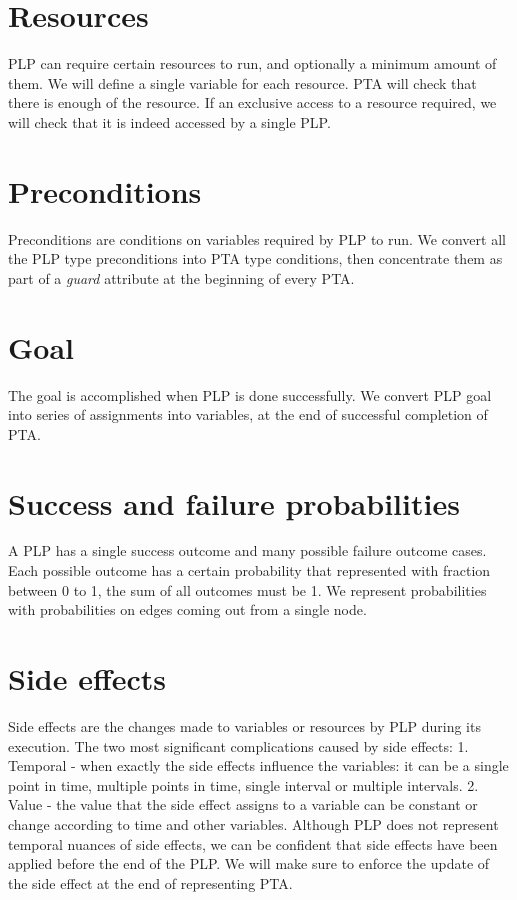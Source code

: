 \section{Resources \label{plp_to_pta_resources}}
PLP can require certain resources to run, and optionally a minimum amount of them. We will define a single variable for each resource. PTA will check that there is enough of the resource. If an exclusive access to a resource required, we will check that it is indeed accessed by a single PLP.\\
\section{Preconditions \label{plp_to_pta_preconditions}}
Preconditions are conditions on variables required by PLP to run. We convert all the PLP type preconditions into PTA type conditions, then concentrate them as part of a \textit{guard} attribute at the beginning of every PTA.\\
\section{Goal \label{plp_to_pta_goal}}
The goal is accomplished when PLP is done successfully. We convert PLP goal into series of assignments into variables, at the end of successful completion of PTA.\\
\section{Success and failure probabilities \label{plp_to_pta_success_and_failure_probabilities}}
A PLP has a single success outcome and many possible failure outcome cases. Each possible outcome has a certain probability that represented with fraction between 0 to 1, the sum of all outcomes must be 1. We represent probabilities with probabilities on edges coming out from a single node. \\
\section{Side effects \label{plp_to_pta_side_effects}}
Side effects are the changes made to variables or resources by PLP during its execution. The two most significant complications caused by side effects: 1. Temporal - when exactly the side effects influence the variables: it can be a single point in time, multiple points in time, single interval or multiple intervals. 2. Value - the value that the side effect assigns to a variable can be constant or change according to time and other variables. Although PLP does not represent temporal nuances of side effects, we can be confident that side effects have been applied before the end of the PLP. We will make sure to enforce the update of the side effect at the end of representing PTA. \\
